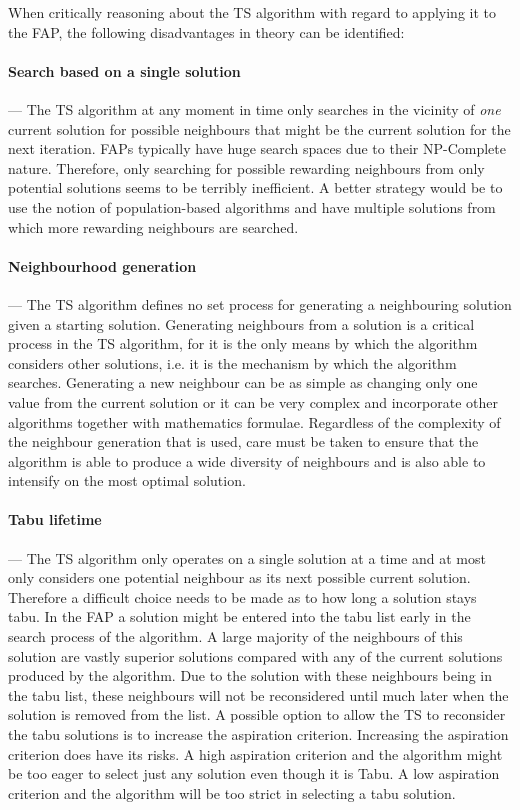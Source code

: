 When critically reasoning about the TS algorithm with regard to applying it to the FAP, the following disadvantages in theory can be identified:
\paragraph{Search based on a single solution}
--- The TS algorithm at any moment in time only searches in the vicinity of \emph{one} current solution for possible neighbours that might be the current solution for the next iteration. FAPs typically have huge search spaces due to their NP-Complete nature. Therefore, only searching for possible rewarding neighbours from only potential solutions seems to be terribly inefficient. A better strategy would be to use the notion of population-based algorithms and have multiple solutions from which more rewarding neighbours are searched.
\paragraph{Neighbourhood generation}
--- The TS algorithm defines no set process for generating a neighbouring solution given a starting solution. Generating neighbours from a solution is a critical process in the TS algorithm, for it is the only means by which the algorithm considers other solutions, i.e. it is the mechanism by which the algorithm searches. Generating a new neighbour can be as simple as changing only one value from the current solution or it can be very complex and incorporate other algorithms together with mathematics formulae. Regardless of the complexity of the neighbour generation that is used, care must be taken to ensure that the algorithm is able to produce a wide diversity of neighbours and is also able to intensify on the most optimal solution.
\paragraph{Tabu lifetime}
--- The TS algorithm only operates on a single solution at a time and at most only considers one potential neighbour as its next possible current solution. Therefore a difficult choice needs to be made as to how long a solution stays tabu. In the FAP a solution might be entered into the tabu list early in the search process of the algorithm. A large majority of the neighbours of this solution are vastly superior solutions compared with any of the current solutions produced by the algorithm. Due to the solution with these neighbours being in the tabu list, these neighbours will not be reconsidered until much later when the solution is removed from the list. A possible option to allow the TS to reconsider the tabu solutions is to increase the aspiration criterion. Increasing the aspiration criterion does have its risks. A high aspiration criterion and the algorithm might be too eager to select just any solution even though it is Tabu. A low aspiration criterion and the algorithm will be too strict in selecting a tabu solution.

